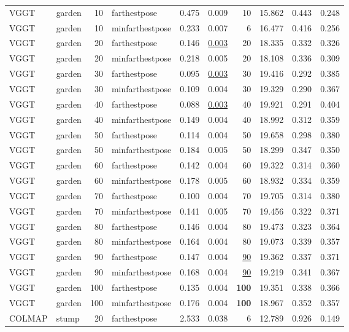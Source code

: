 \begin{table}[H]
\begin{tabular}{llrlrrrrrr}
VGGT & garden & 10 & farthestpose & 0.475 & 0.009 & 10 & 15.862 & 0.443 & 0.248 \\
VGGT & garden & 10 & minfarthestpose & 0.233 & 0.007 & 6 & 16.477 & 0.416 & 0.256 \\
VGGT & garden & 20 & farthestpose & 0.146 & \underline{0.003} & 20 & 18.335 & 0.332 & 0.326 \\
VGGT & garden & 20 & minfarthestpose & 0.218 & 0.005 & 20 & 18.108 & 0.336 & 0.309 \\
VGGT & garden & 30 & farthestpose & 0.095 & \underline{0.003} & 30 & 19.416 & 0.292 & 0.385 \\
VGGT & garden & 30 & minfarthestpose & 0.109 & 0.004 & 30 & 19.329 & 0.290 & 0.367 \\
VGGT & garden & 40 & farthestpose & 0.088 & \underline{0.003} & 40 & 19.921 & 0.291 & 0.404 \\
VGGT & garden & 40 & minfarthestpose & 0.149 & 0.004 & 40 & 18.992 & 0.312 & 0.359 \\
VGGT & garden & 50 & farthestpose & 0.114 & 0.004 & 50 & 19.658 & 0.298 & 0.380 \\
VGGT & garden & 50 & minfarthestpose & 0.184 & 0.005 & 50 & 18.299 & 0.347 & 0.350 \\
VGGT & garden & 60 & farthestpose & 0.142 & 0.004 & 60 & 19.322 & 0.314 & 0.360 \\
VGGT & garden & 60 & minfarthestpose & 0.178 & 0.005 & 60 & 18.932 & 0.334 & 0.359 \\
VGGT & garden & 70 & farthestpose & 0.100 & 0.004 & 70 & 19.705 & 0.314 & 0.380 \\
VGGT & garden & 70 & minfarthestpose & 0.141 & 0.005 & 70 & 19.456 & 0.322 & 0.371 \\
VGGT & garden & 80 & farthestpose & 0.146 & 0.004 & 80 & 19.473 & 0.323 & 0.364 \\
VGGT & garden & 80 & minfarthestpose & 0.164 & 0.004 & 80 & 19.073 & 0.339 & 0.357 \\
VGGT & garden & 90 & farthestpose & 0.147 & 0.004 & \underline{90} & 19.362 & 0.337 & 0.371 \\
VGGT & garden & 90 & minfarthestpose & 0.168 & 0.004 & \underline{90} & 19.219 & 0.341 & 0.367 \\
VGGT & garden & 100 & farthestpose & 0.135 & 0.004 & \textbf{100} & 19.351 & 0.338 & 0.366 \\
VGGT & garden & 100 & minfarthestpose & 0.176 & 0.004 & \textbf{100} & 18.967 & 0.352 & 0.357 \\
\midrule
COLMAP & stump & 20 & farthestpose & 2.533 & 0.038 & 6 & 12.789 & 0.926 & 0.149 \\

\end{tabular}
\end{table}

